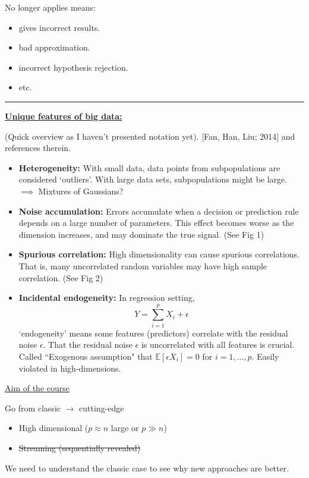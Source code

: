 \documentclass[twoside]{article}
\begin{document}
No longer applies means:

\begin{itemize}
	\item gives incorrect results.
	\item bad approximation.
	\item incorrect hypothesis rejection.
	\item etc.
\end{itemize}

\hrule

\underline{\textbf{Unique features of big data:}}

(Quick overview as I haven't presented notation yet). [Fan, Han, Liu; 2014] and references therein.

\begin{itemize}
	\item \textbf{Heterogeneity:} With small data, data points from subpopulations are considered `outliers'. With large data sets, subpopulations might be large. $\implies$ Mixtures of Gaussians?
	\item \textbf{Noise accumulation:} Errors accumulate when a decision or prediction rule depends on a large number of parameters. This effect becomes worse as the dimension increases, and may dominate the true signal. (See Fig 1)
	\item \textbf{Spurious correlation:} High dimensionality can cause spurious correlations. That is, many uncorrelated random variables may have high sample correlation. (See Fig 2)
	\item \textbf{Incidental endogeneity:} In regression setting, $$Y=\sum^p_{i=1}X_i+\epsilon$$
		`endogeneity' means some features (predictors) correlate with the residual noise $\epsilon$.
		That the residual noise $\epsilon$ is uncorrelated with all features is crucial. Called ``Exogenous assumption" that $\mathbb{E}[\epsilon X_i]=0$ for $i=1,\dots, p$.
		Easily violated in high-dimensions.
\end{itemize}

\underline{Aim of the course}

Go from classic $\longrightarrow$ cutting-edge
\begin{itemize}
	\item High dimensional ($p\approx n$ large or $p\gg n$)
	\item \st{Streaming (sequentially revealed)}
\end{itemize}

We need to understand the classic case to see why new approaches are better.
\end{document}
